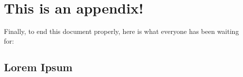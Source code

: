 \chapter{This is an appendix!}
\label{ap:appendix}
Finally, to end this document properly, here is what everyone has been waiting for:

\section{Lorem Ipsum}
\lipsum[1-7]